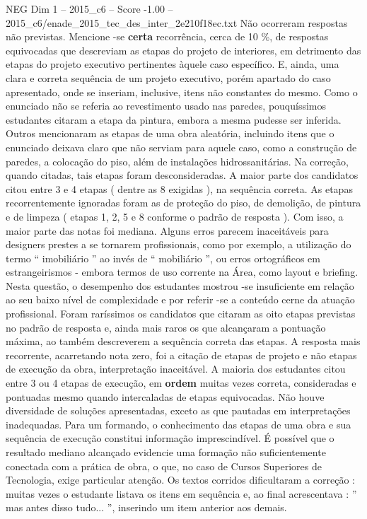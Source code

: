 \begin{textsample}{NEG Dim 1 – 2015\_c6 – Score -1.00 – 2015\_c6/enade\_2015\_tec\_des\_inter\_2e210f18ec.txt}
Não ocorreram respostas não previstas.
Mencione -se \textbf{certa} recorrência, cerca de 10 \%, de respostas equivocadas que descreviam as etapas do projeto de interiores, em detrimento das etapas do projeto executivo pertinentes àquele caso específico.
E, ainda, uma clara e correta sequência de um projeto executivo, porém apartado do caso apresentado, onde se inseriam, inclusive, itens não constantes do mesmo.
Como o enunciado não se referia ao revestimento usado nas paredes, pouquíssimos estudantes citaram a etapa da pintura, embora a mesma pudesse ser inferida.
Outros mencionaram as etapas de uma obra aleatória, incluindo itens que o enunciado deixava claro que não serviam para aquele caso, como a construção de paredes, a colocação do piso, além de instalações hidrossanitárias.
Na correção, quando citadas, tais etapas foram desconsideradas.
A maior parte dos candidatos citou entre 3 e 4 etapas ( dentre as 8 exigidas ), na sequência correta.
As etapas recorrentemente ignoradas foram as de proteção do piso, de demolição, de pintura e de limpeza ( etapas 1, 2, 5 e 8 conforme o padrão de resposta ).
Com isso, a maior parte das notas foi mediana.
Alguns erros parecem inaceitáveis para designers prestes a se tornarem profissionais, como por exemplo, a utilização do termo “ imobiliário ” ao invés de “ mobiliário ”, ou erros ortográficos em estrangeirismos - embora termos de uso corrente na Área, como layout e briefing.
Nesta questão, o desempenho dos estudantes mostrou -se insuficiente em relação ao seu baixo nível de complexidade e por referir -se a conteúdo cerne da atuação profissional.
Foram raríssimos os candidatos que citaram as oito etapas previstas no padrão de resposta e, ainda mais raros os que alcançaram a pontuação máxima, ao também descreverem a sequência correta das etapas.
A resposta mais recorrente, acarretando nota zero, foi a citação de etapas de projeto e não etapas de execução da obra, interpretação inaceitável.
A maioria dos estudantes citou entre 3 ou 4 etapas de execução, em \textbf{ordem} muitas vezes correta, consideradas e pontuadas mesmo quando intercaladas de etapas equivocadas.
Não houve diversidade de soluções apresentadas, exceto as que pautadas em interpretações inadequadas.
Para um formando, o conhecimento das etapas de uma obra e sua sequência de execução constitui informação imprescindível.
É possível que o resultado mediano alcançado evidencie uma formação não suficientemente conectada com a prática de obra, o que, no caso de Cursos Superiores de Tecnologia, exige particular atenção.
Os textos corridos dificultaram a correção : muitas vezes o estudante listava os itens em sequência e, ao final acrescentava : ” mas antes disso tudo... ”, inserindo um item anterior aos demais.

\end{textsample}
